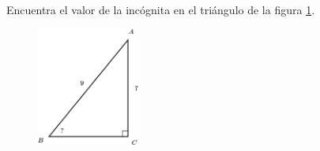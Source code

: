 Encuentra el valor de la incógnita en el triángulo de la figura \ref{fig:angle_functrig_06}.
\begin{figure}[H]
    \begin{center}
        \includegraphics[width=0.3\textwidth]{../images/angle_functrig_06.png}
    \end{center}
    \caption{}
    \label{fig:angle_functrig_06}
\end{figure}